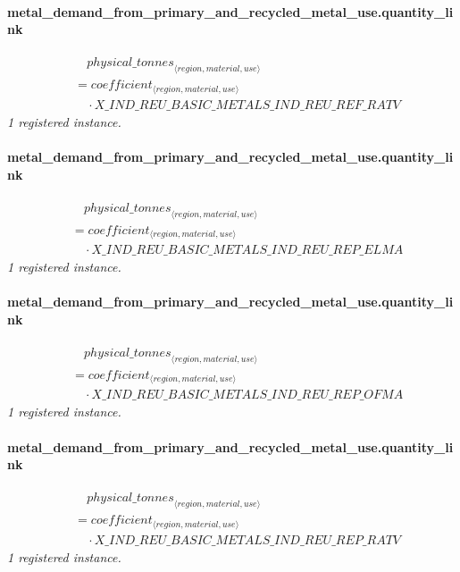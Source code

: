 \documentclass[11pt]{article}
\begin{document}
\paragraph{metal\_demand\_from\_primary\_and\_recycled\_metal\_use.quantity\_link}
\begin{align*}
&\quad {physical\_tonnes}_{\langle region, material, use\rangle}\\
&= coefficient_{\langle region, material, use\rangle}\\
&\quad {}\cdot X\_IND\_REU\_BASIC\_METALS\_IND\_REU\_REF\_RATV
\end{align*}
\noindent\emph{1 registered instance.}\par
\paragraph{metal\_demand\_from\_primary\_and\_recycled\_metal\_use.quantity\_link}
\begin{align*}
&\quad {physical\_tonnes}_{\langle region, material, use\rangle}\\
&= coefficient_{\langle region, material, use\rangle}\\
&\quad {}\cdot X\_IND\_REU\_BASIC\_METALS\_IND\_REU\_REP\_ELMA
\end{align*}
\noindent\emph{1 registered instance.}\par
\paragraph{metal\_demand\_from\_primary\_and\_recycled\_metal\_use.quantity\_link}
\begin{align*}
&\quad {physical\_tonnes}_{\langle region, material, use\rangle}\\
&= coefficient_{\langle region, material, use\rangle}\\
&\quad {}\cdot X\_IND\_REU\_BASIC\_METALS\_IND\_REU\_REP\_OFMA
\end{align*}
\noindent\emph{1 registered instance.}\par
\paragraph{metal\_demand\_from\_primary\_and\_recycled\_metal\_use.quantity\_link}
\begin{align*}
&\quad {physical\_tonnes}_{\langle region, material, use\rangle}\\
&= coefficient_{\langle region, material, use\rangle}\\
&\quad {}\cdot X\_IND\_REU\_BASIC\_METALS\_IND\_REU\_REP\_RATV
\end{align*}
\noindent\emph{1 registered instance.}\par
\end{document}
